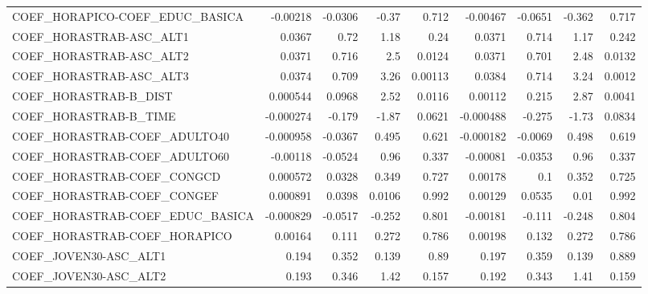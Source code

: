 \begin{tabular}{lrrrrrrrr}
COEF\_HORAPICO-COEF\_EDUC\_BASICA    &    -0.00218 &      -0.0306 &   -0.37 &    0.712 &   -0.00467 &     -0.0651 &       -0.362 &         0.717 \\
COEF\_HORASTRAB-ASC\_ALT1           &      0.0367 &         0.72 &    1.18 &     0.24 &     0.0371 &       0.714 &         1.17 &         0.242 \\
COEF\_HORASTRAB-ASC\_ALT2           &      0.0371 &        0.716 &     2.5 &   0.0124 &     0.0371 &       0.701 &         2.48 &        0.0132 \\
COEF\_HORASTRAB-ASC\_ALT3           &      0.0374 &        0.709 &    3.26 &  0.00113 &     0.0384 &       0.714 &         3.24 &        0.0012 \\
COEF\_HORASTRAB-B\_DIST             &    0.000544 &       0.0968 &    2.52 &   0.0116 &    0.00112 &       0.215 &         2.87 &        0.0041 \\
COEF\_HORASTRAB-B\_TIME             &   -0.000274 &       -0.179 &   -1.87 &   0.0621 &  -0.000488 &      -0.275 &        -1.73 &        0.0834 \\
COEF\_HORASTRAB-COEF\_ADULTO40      &   -0.000958 &      -0.0367 &   0.495 &    0.621 &  -0.000182 &     -0.0069 &        0.498 &         0.619 \\
COEF\_HORASTRAB-COEF\_ADULTO60      &    -0.00118 &      -0.0524 &    0.96 &    0.337 &   -0.00081 &     -0.0353 &         0.96 &         0.337 \\
COEF\_HORASTRAB-COEF\_CONGCD        &    0.000572 &       0.0328 &   0.349 &    0.727 &    0.00178 &         0.1 &        0.352 &         0.725 \\
COEF\_HORASTRAB-COEF\_CONGEF        &    0.000891 &       0.0398 &  0.0106 &    0.992 &    0.00129 &      0.0535 &         0.01 &         0.992 \\
COEF\_HORASTRAB-COEF\_EDUC\_BASICA   &   -0.000829 &      -0.0517 &  -0.252 &    0.801 &   -0.00181 &      -0.111 &       -0.248 &         0.804 \\
COEF\_HORASTRAB-COEF\_HORAPICO      &     0.00164 &        0.111 &   0.272 &    0.786 &    0.00198 &       0.132 &        0.272 &         0.786 \\
COEF\_JOVEN30-ASC\_ALT1             &       0.194 &        0.352 &   0.139 &     0.89 &      0.197 &       0.359 &        0.139 &         0.889 \\
COEF\_JOVEN30-ASC\_ALT2             &       0.193 &        0.346 &    1.42 &    0.157 &      0.192 &       0.343 &         1.41 &         0.159 \\

\end{tabular}
